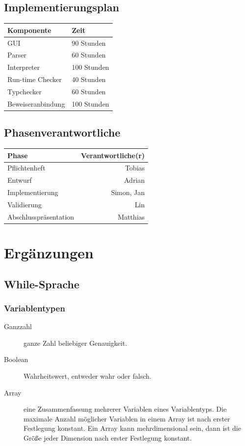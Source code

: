 \documentclass[a4paper,10pt]{article}
\begin{document}
\subsection{Implementierungsplan}
\begin{tabular}[h]{| l | l |}
\hline
\textbf{Komponente} & \textbf{Zeit}\\
\hline
GUI & 90 Stunden\\
Parser & 60 Stunden\\
Interpreter & 100 Stunden\\
Run-time Checker & 40 Stunden\\
Typchecker & 60 Stunden\\
Beweiseranbindung & 100 Stunden\\
\hline
\end{tabular}
\subsection{Phasenverantwortliche}
\begin{tabular}[h]{| l | r |}
\hline
\textbf{Phase} & \textbf{Verantwortliche(r)}\\
\hline
Pflichtenheft & Tobias\\
\hline
Entwurf & Adrian\\
\hline
Implementierung & Simon, Jan\\
\hline
Validierung & Lin\\
\hline
Abschlusspr\"{a}sentation & Matthias\\
\hline
\end{tabular}

\section{Erg\"{a}nzungen}
\subsection{While-Sprache}
\subsubsection{Variablentypen}
\begin{description}
\item[Ganzzahl] ganze Zahl beliebiger Genauigkeit.
\item[Boolean] Wahrheitswert, entweder wahr oder falsch.
\item[Array] eine Zusammenfassung mehrerer Variablen eines Variablentyps. Die maximale Anzahl m\"{o}glicher Variablen in einem Array ist nach erster Festlegung konstant. Ein Array kann mehrdimensional sein, dann ist die Gr\"{\"{o}}\ss{}e jeder Dimension nach erster Festlegung konstant.
\end{description}
\end{document}
